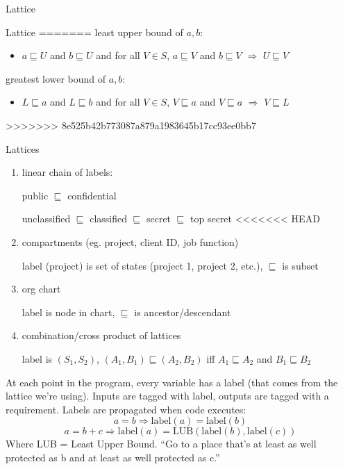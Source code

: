 \begin{definition}{Lattice}
\begin{definition}{Lattice}
=======
    least upper bound of $a, b$:
    \begin{itemize}
        \item $a \sqsubseteq U$ and $b \sqsubseteq U$ and for all $V \in S$,
            $a \sqsubseteq V$ and $b \sqsubseteq V$ $\Rightarrow$
            $U \sqsubseteq V$
    \end{itemize}
    greatest lower bound of $a, b$:
    \begin{itemize}
        \item $L \sqsubseteq a$ and $L \sqsubseteq b$ and for all $V \in S$,
            $V \sqsubseteq a$ and $V \sqsubseteq a$ $\Rightarrow$
            $V \sqsubseteq L$
    \end{itemize}
>>>>>>> 8e525b42b773087a879a1983645b17cc93ee0bb7
\end{definition}
\begin{example}{Lattices}
    \begin{enumerate}
        \item linear chain of labels:

            public $\sqsubseteq$ confidential

            unclassified $\sqsubseteq$ classified $\sqsubseteq$ secret
                $\sqsubseteq$ top secret
<<<<<<< HEAD
        \item compartments (eg. project, client ID, job function)

            label (project) is set of states (project 1, project 2, etc.), $\sqsubseteq$ is subset
        \item org chart

            label is node in chart, $\sqsubseteq$ is ancestor/descendant
        \item combination/cross product of lattices

            label is $(S_1, S_2)$, $(A_1, B_1) \sqsubseteq (A_2, B_2)$ iff
            $A_1 \sqsubseteq A_2$ and $B_1 \sqsubseteq B_2$
    \end{enumerate}
\end{example}
At each point in the program, every variable has a label (that comes from the
lattice we're using). Inputs are tagged with label, outputs are tagged with a requirement. Labels are propagated
when code executes:
$$a = b \Rightarrow \text{label}(a) = \text{label}(b)$$
$$a = b + c \Rightarrow \text{label}(a) = \text{LUB}(\text{label}(b), \text{label}(c))$$
Where LUB = Least Upper Bound. ``Go to a place that's at least as well protected as b and at least as well protected as c.''


\end{definition}
